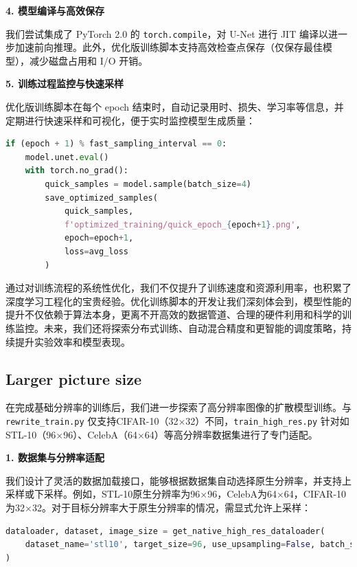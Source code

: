 \documentclass{ctexart}
\begin{document}
\vspace{0.5em}
\noindent
\textbf{4. 模型编译与高效保存}

我们尝试集成了 PyTorch 2.0 的 \texttt{torch.compile}，对 U-Net 进行 JIT 编译以进一步加速前向推理。此外，优化版训练脚本支持高效检查点保存（仅保存最佳模型），减少磁盘占用和 I/O 开销。

\vspace{0.5em}
\noindent
\textbf{5. 训练过程监控与快速采样}

优化版训练脚本在每个 epoch 结束时，自动记录用时、损失、学习率等信息，并定期进行快速采样和可视化，便于实时监控模型生成质量：

\begin{lstlisting}[language=python]
if (epoch + 1) % fast_sampling_interval == 0:
    model.unet.eval()
    with torch.no_grad():
        quick_samples = model.sample(batch_size=4)
        save_optimized_samples(
            quick_samples, 
            f'optimized_training/quick_epoch_{epoch+1}.png',
            epoch=epoch+1,
            loss=avg_loss
        )
\end{lstlisting}

\vspace{0.5em}

\noindent
通过对训练流程的系统性优化，我们不仅提升了训练速度和资源利用率，也积累了深度学习工程化的宝贵经验。优化训练脚本的开发让我们深刻体会到，模型性能的提升不仅依赖于算法本身，更离不开高效的数据管道、合理的硬件利用和科学的训练监控。未来，我们还将探索分布式训练、自动混合精度和更智能的调度策略，持续提升实验效率和模型表现。


\subsection{Larger picture size}
\noindent
在完成基础分辨率的训练后，我们进一步探索了高分辨率图像的扩散模型训练。与 \texttt{rewrite\_train.py} 仅支持CIFAR-10（32$\times$32）不同，\texttt{train\_high\_res.py} 针对如STL-10（96$\times$96）、CelebA（64$\times$64）等高分辨率数据集进行了专门适配。

\vspace{0.5em}
\noindent
\textbf{1. 数据集与分辨率适配}

我们设计了灵活的数据加载接口，能够根据数据集自动选择原生分辨率，并支持上采样或下采样。例如，STL-10原生分辨率为96$\times$96，CelebA为64$\times$64，CIFAR-10为32$\times$32。对于目标分辨率大于原生分辨率的情况，需显式允许上采样：

\begin{lstlisting}[language=python]
dataloader, dataset, image_size = get_native_high_res_dataloader(
    dataset_name='stl10', target_size=96, use_upsampling=False, batch_size=16
)
\end{lstlisting}
\end{document}
